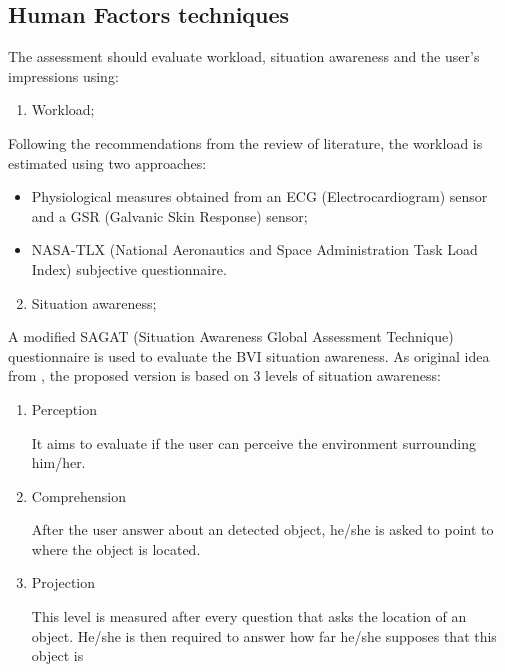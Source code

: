     \subsection*{Human Factors techniques}
    The assessment should evaluate workload, situation awareness and the user's impressions using:

%    

    \begin{enumerate} [1.]
        \setcounter{enumi}{0}
        \item Workload;
    \end{enumerate}

    Following the recommendations from the review of literature, the workload is estimated using two approaches:
    \begin{itemize}
        \item Physiological measures obtained from an ECG (Electrocardiogram) sensor and a GSR (Galvanic Skin Response) sensor;
        \item NASA-TLX (National Aeronautics and Space Administration Task Load Index) subjective questionnaire.
    \end{itemize}

    \begin{enumerate} [2.]
        \setcounter{enumi}{1}
        \item Situation awareness;
    \end{enumerate}

    A modified SAGAT (Situation Awareness Global Assessment Technique) questionnaire is used to evaluate the BVI situation awareness.
    As original idea from \cite{endsley1988design}, the proposed version is based on 3 levels of situation awareness:
    
    \begin{enumerate}[Level 1.]%
        \item Perception
        
        It aims to evaluate if the user can perceive the environment surrounding him/her.

        \item Comprehension

        After the user answer about an detected object, he/she is asked to point to where the object is located. 

        \item Projection
        
        This level is measured after every question that asks the location of an object. He/she is then required to answer how far he/she supposes that this object is
        
    \end{enumerate}      

